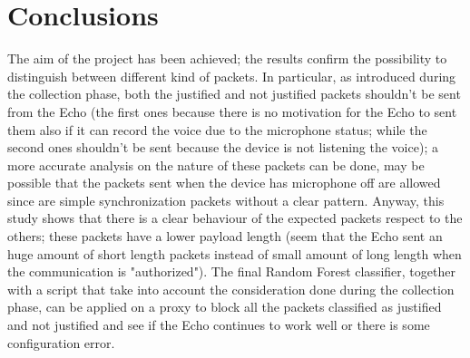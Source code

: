 \documentclass[sigconf]{acmart}
\begin{document}
    \section{Conclusions}
    The aim of the project has been achieved; the results confirm the possibility to distinguish between different kind of packets. In particular, as introduced during the collection phase, both the justified and not justified packets shouldn't be sent from the Echo (the first ones because there is no motivation for the Echo to sent them also if it can record the voice due to the microphone status; while the second ones shouldn't be sent because the device is not listening the voice); a more accurate analysis on the nature of these packets can be done, may be possible that the packets sent when the device has microphone off are allowed since are simple synchronization packets without a clear pattern. Anyway, this study shows that there is a clear behaviour of the expected packets respect to the others; these packets have a lower payload length (seem that the Echo sent an huge amount of short length packets instead of small amount of long length when the communication is "authorized").
The final Random Forest classifier, together with a script that take into account the consideration done during the collection phase, can be applied on a proxy to block all the packets classified as justified and not justified and see if the Echo continues to work well or there is some configuration error.

    
    
\end{document}
